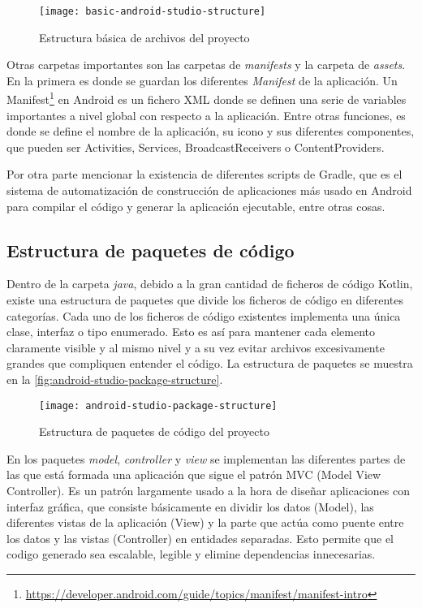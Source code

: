 \begin{figure}[H]
	\centering
	\texttt{[image: basic-android-studio-structure]}
	\caption{Estructura básica de archivos del proyecto}
	\label{fig:basic-android-studio-structure}
\end{figure}

Otras carpetas importantes son las carpetas de \textit{manifests} y la carpeta de \textit{assets}. En la primera es donde se guardan los diferentes \textit{Manifest} de la aplicación. Un Manifest\footnote{\url{https://developer.android.com/guide/topics/manifest/manifest-intro}} en Android es un fichero XML donde se definen una serie de variables importantes a nivel global con respecto a la aplicación. Entre otras funciones, es donde se define el nombre de la aplicación, su icono y sus diferentes componentes, que pueden ser Activities, Services, BroadcastReceivers o ContentProviders.

Por otra parte mencionar la existencia de diferentes scripts de Gradle, que es el sistema de automatización de construcción de aplicaciones más usado en Android para compilar el código y generar la aplicación ejecutable, entre otras cosas.

\subsection{Estructura de paquetes de código}

Dentro de la carpeta \textit{java}, debido a la gran cantidad de ficheros de código Kotlin, existe una estructura de paquetes que divide los ficheros de código en diferentes categorías. Cada uno de los ficheros de código existentes implementa una única clase, interfaz o tipo enumerado. Esto es así para mantener cada elemento claramente visible y al mismo nivel y a su vez evitar archivos excesivamente grandes que compliquen entender el código. La estructura de paquetes se muestra en la \autoref{fig:android-studio-package-structure}.

\begin{figure}[H]
	\centering
	\texttt{[image: android-studio-package-structure]}
	\caption{Estructura de paquetes de código del proyecto}
	\label{fig:android-studio-package-structure}
\end{figure}

En los paquetes \textit{model}, \textit{controller} y \textit{view} se implementan las diferentes partes de las que está formada una aplicación que sigue el patrón MVC (Model View Controller). Es un patrón largamente usado a la hora de diseñar aplicaciones con interfaz gráfica, que consiste básicamente en dividir los datos (Model), las diferentes vistas de la aplicación (View) y la parte que actúa como puente entre los datos y las vistas (Controller) en entidades separadas. Esto permite que el codigo generado sea escalable, legible y elimine dependencias innecesarias. 


